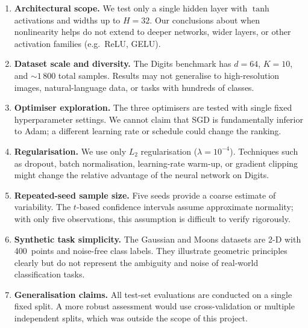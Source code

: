 \documentclass[11pt]{article}
\begin{document}
\begin{enumerate}[leftmargin=2em,itemsep=0.3em]
  \item \textbf{Architectural scope.}
        We test only a single hidden layer with $\tanh$ activations and widths up to $H{=}32$.
        Our conclusions about when nonlinearity helps do not extend to deeper networks, wider
        layers, or other activation families (e.g.\ ReLU, GELU).

  \item \textbf{Dataset scale and diversity.}
        The Digits benchmark has $d{=}64$, $K{=}10$, and ${\sim}1\,800$ total samples.  Results
        may not generalise to high-resolution images, natural-language data, or tasks with
        hundreds of classes.

  \item \textbf{Optimiser exploration.}
        The three optimisers are tested with single fixed hyperparameter settings.  We cannot
        claim that SGD is fundamentally inferior to Adam; a different learning rate or schedule
        could change the ranking.

  \item \textbf{Regularisation.}
        We use only $L_2$ regularisation ($\lambda{=}10^{-4}$).  Techniques such as dropout,
        batch normalisation, learning-rate warm-up, or gradient clipping might change the
        relative advantage of the neural network on Digits.

  \item \textbf{Repeated-seed sample size.}
        Five seeds provide a coarse estimate of variability.  The $t$-based confidence intervals
        assume approximate normality; with only five observations, this assumption is
        difficult to verify rigorously.

  \item \textbf{Synthetic task simplicity.}
        The Gaussian and Moons datasets are 2-D with 400~points and noise-free class labels.
        They illustrate geometric principles clearly but do not represent the ambiguity and noise
        of real-world classification tasks.

  \item \textbf{Generalisation claims.}
        All test-set evaluations are conducted on a single fixed split.  A more robust
        assessment would use cross-validation or multiple independent splits, which was outside
        the scope of this project.
\end{enumerate}
\end{document}
